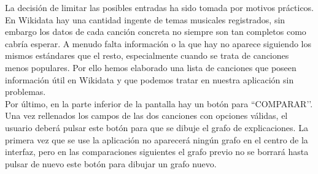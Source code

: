 La decisión de limitar las posibles entradas ha sido tomada por motivos prácticos. En Wikidata hay una cantidad ingente de temas musicales registrados, sin embargo los datos de cada canción concreta no siempre son tan completos como cabría esperar. A menudo falta información o la que hay no aparece siguiendo los mismos estándares que el resto, especialmente cuando se trata de canciones menos populares. Por ello hemos elaborado una lista de canciones que poseen información útil en Wikidata y que podemos tratar en nuestra aplicación sin problemas.\\

Por último, en la parte inferior de la pantalla hay un botón para ``COMPARAR’’. Una vez rellenados los campos de las dos canciones con opciones válidas, el usuario deberá pulsar este botón para que se dibuje el grafo de explicaciones. La primera vez que se use la aplicación no aparecerá ningún grafo en el centro de la interfaz, pero en las comparaciones siguientes el grafo previo no se borrará hasta pulsar de nuevo este botón para dibujar un grafo nuevo.\\
